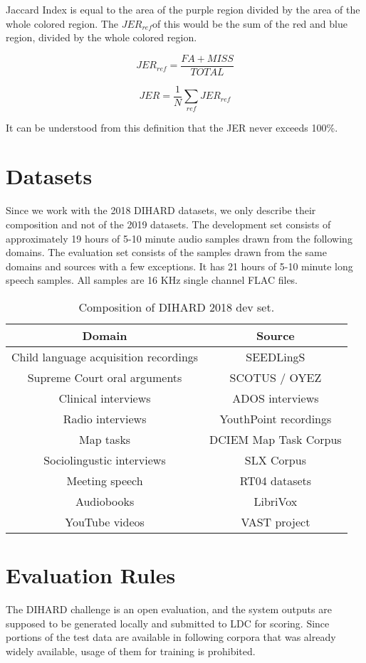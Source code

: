 	Jaccard Index is equal to the area of the purple region divided by the area of the whole colored region. The $JER_{ref}$of this would be the sum of the red and blue region, divided by the whole colored region.
	
	$$ JER_{ref} = \frac{FA + MISS}{TOTAL} $$
	
	$$ JER = \frac{1}{N}\sum_{ref}JER_{ref} $$
	
	It can be understood from this definition that the JER never exceeds 100\%.
	
\section{Datasets}
Since we work with the 2018 DIHARD datasets, we only describe their composition and not of the 2019 datasets. The development set consists of approximately 19 hours of 5-10 minute audio samples drawn from the following domains. The evaluation set consists of the samples drawn from the same domains and sources with a few exceptions. It has 21 hours of 5-10 minute long speech samples. All samples are 16 KHz single channel FLAC files.

\begin{table}[h]
	\centering
	\begin{tabular}{|c|c|}
		\hline
		Domain & Source \\
		\hline
		Child language acquisition recordings & SEEDLingS \\
		Supreme Court oral arguments & SCOTUS / OYEZ \\
		Clinical interviews & ADOS interviews \\
		Radio interviews & YouthPoint recordings \\
		Map tasks & DCIEM Map Task Corpus \\
		Sociolingustic interviews & SLX Corpus \\
		Meeting speech & RT04 datasets \\
		Audiobooks & LibriVox \\
		YouTube videos & VAST project \\
		\hline
	\end{tabular}
	\caption{Composition of DIHARD 2018 dev set.}
	\label{table-dihard-dev-composition}
\end{table}

\section{Evaluation Rules}
The DIHARD challenge is an open evaluation, and the system outputs are supposed to be generated locally and submitted to LDC for scoring. Since portions of the test data are available in following corpora that was already widely available, usage of them for training is prohibited.

